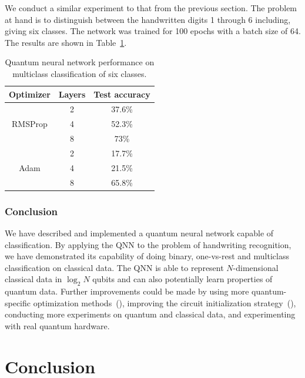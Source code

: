 \documentclass[a4paper,10pt]{article}
\begin{document}
We conduct a similar experiment to that from the previous section.
The problem at hand is to distinguish between the handwritten digits 1 through 6 including, giving six classes.
The network was trained for 100 epochs with a batch size of 64.
The results are shown in Table~\ref{table:multiclass_results}.
\begin{table}[h!]
	\centering
	\begin{tabular}{ c|c|c } 
		\hline
		Optimizer & Layers & Test accuracy \\
		\hline
		\multirow{3}{4em}{RMSProp} & 2 & 37.6\% \\ 
		& 4 & 52.3\% \\ 
		& 8 & 73\% \\
		\hline
		\multirow{3}{4em}{Adam} & 2 & 17.7\% \\ 
		& 4 & 21.5\% \\ 
		& 8 & 65.8\% \\ 
		\hline
	\end{tabular}
	\caption{Quantum neural network performance on multiclass classification of six classes.}
	\label{table:multiclass_results}
\end{table}

\subsubsection{Conclusion}
We have described and implemented a quantum neural network capable of classification.
By applying the QNN to the problem of handwriting recognition, we have demonstrated its capability of doing binary, one-vs-rest and multiclass classification on classical data.
The QNN is able to represent $N$-dimensional classical data in $\log_2N$ qubits and can also potentially learn properties of quantum data.
Further improvements could be made by using more quantum-specific optimization methods~(\cite{stokes2019quantum, sweke2019stochastic}), improving the circuit initialization strategy~(\cite{mcclean2018barren}), conducting more experiments on quantum and classical data, and experimenting with real quantum hardware.

\section{Conclusion} \label{sec:conclusion}

\clearpage

\printbibliography[heading=bibintoc]
\end{document}
